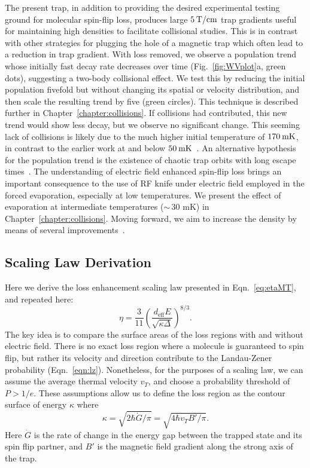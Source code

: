 The present trap, in addition to providing the desired experimental testing ground for molecular spin-flip loss, produces large $5{\nobreak\hspace{.2em}}\text{T/cm}$ trap gradients useful for maintaining high densities to facilitate collisional studies.
This is in contrast with other strategies for plugging the hole of a magnetic trap which often lead to a reduction in trap gradient.
With loss removed, we observe a population trend whose initially fast decay rate decreases over time (Fig.~\ref{fig:WVplot}a, green dots), suggesting a two-body collisional effect.
We test this by reducing the initial population fivefold but without changing its spatial or velocity distribution, and then scale the resulting trend by five (green circles).
This technique is described further in Chapter~\ref{chapter:collisions}.
If collisions had contributed, this new trend would show less decay, but we observe no significant change.
This seeming lack of collisions is likely due to the much higher initial temperature of $170{\nobreak\hspace{.2em}}\text{mK}$, in contrast to the earlier work at and below $50{\nobreak\hspace{.2em}}\text{mK}$~\cite{Stuhl2012evap}. An alternative hypothesis for the population trend is the existence of chaotic trap orbits with long escape times~\cite{Gonzalez-Ferez2014}.  The understanding of electric field enhanced spin-flip loss brings an important consequence to the use of RF knife under electric field employed in the forced evaporation, especially at low temperatures. We present the effect of evaporation at intermediate temperatures (${\sim}\,30\text{ mK}$) in Chapter~\ref{chapter:collisions}.  Moving forward, we aim to increase the density by means of several improvements~\cite{Even2015,Segev2017}.

\subsection{Scaling Law Derivation\label{sec:der}}

Here we derive the loss enhancement scaling law presented in Eqn.~\ref{eq:etaMT}, and repeated here:
\begin{equation}
\eta=\frac{3}{11} \left(\frac{d_\text{eff}E}{\sqrt{\kappa\Delta}}\right)^{8/3}.
\end{equation}
The key idea is to compare the surface areas of the loss regions with and without electric field.
There is no exact loss region where a molecule is guaranteed to spin flip, but rather its velocity and direction contribute to the Landau-Zener probability (Eqn.~\ref{eqn:lz}).
Nonetheless, for the purposes of a scaling law, we can assume the average thermal velocity $v_T$, and choose a probability threshold of $P>1/e$.
These assumptions allow us to define the loss region as the contour surface of energy $\kappa$ where
\begin{equation}
\kappa=\sqrt{2\hbar\dot{G}/\pi}=\sqrt{4\hbar v_T B'/\pi}.
\end{equation}
Here $\dot{G}$ is the rate of change in the energy gap between the trapped state and its spin flip partner, and $B'$ is the magnetic field gradient along the strong axis of the trap.

